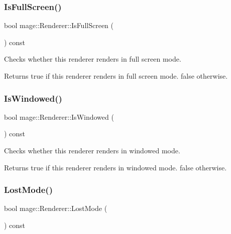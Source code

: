 \subsubsection{\texorpdfstring{Is\+Full\+Screen()}{IsFullScreen()}}
{\footnotesize\ttfamily bool mage\+::\+Renderer\+::\+Is\+Full\+Screen (\begin{DoxyParamCaption}{ }\end{DoxyParamCaption}) const}

Checks whether this renderer renders in full screen mode.

\begin{DoxyReturn}{Returns}
{\ttfamily true} if this renderer renders in full screen mode. {\ttfamily false} otherwise. 
\end{DoxyReturn}
\hypertarget{classmage_1_1_renderer_a1de1804c1eedae7dc12435a520a10b9c}{}\label{classmage_1_1_renderer_a1de1804c1eedae7dc12435a520a10b9c} 
\subsubsection{\texorpdfstring{Is\+Windowed()}{IsWindowed()}}
{\footnotesize\ttfamily bool mage\+::\+Renderer\+::\+Is\+Windowed (\begin{DoxyParamCaption}{ }\end{DoxyParamCaption}) const}

Checks whether this renderer renders in windowed mode.

\begin{DoxyReturn}{Returns}
{\ttfamily true} if this renderer renders in windowed mode. {\ttfamily false} otherwise. 
\end{DoxyReturn}
\hypertarget{classmage_1_1_renderer_afdde83a1e2bc9288f000fb2575c525d0}{}\label{classmage_1_1_renderer_afdde83a1e2bc9288f000fb2575c525d0} 
\subsubsection{\texorpdfstring{Lost\+Mode()}{LostMode()}}
{\footnotesize\ttfamily bool mage\+::\+Renderer\+::\+Lost\+Mode (\begin{DoxyParamCaption}{ }\end{DoxyParamCaption}) const}

